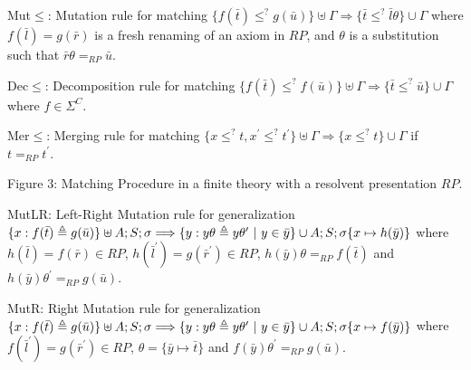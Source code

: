     
\par
 
Mut\ensuremath{\leq}: Mutation rule for matching  $\{f(\bar{t})\leq^{?}g(\bar{u})\}\uplus\Gamma\Longrightarrow\{\bar{t}\leq^{?}\bar{l}\theta\}\cup\Gamma$ where $f(\bar{l})=g(\bar{r})$ is a fresh renaming of an axiom in $RP$, and $\theta$ is a substitution such that $\bar{r}\theta=_{RP}\bar{u}$.\par
     
\par
 
Dec\ensuremath{\leq}: Decomposition rule for matching  $\{f(\bar{t})\leq^{?}f(\bar{u})\}\uplus\Gamma\Longrightarrow\{\bar{t}\leq^{?}\bar{u}\}\cup\Gamma$ where $f\in{\Sigma}^{C}$.\par
      
\par
 
Mer\ensuremath{\leq}: Merging rule for matching  $\{x\leq^{?}t,x^{\prime}\leq^{?}t^{\prime}\}\uplus\Gamma\Longrightarrow\{x\leq^{?}t\}\cup\Gamma$ if $t=_{RP}t^{\prime}$.\par
    
Figure 3: Matching Procedure in a finite theory with a resolvent presentation $RP$.\par
 
 
    
\par
 
MutLR: Left-Right Mutation rule for generalization  $\{x:f(\bar{t})\triangleq g(\bar{u})\}\uplus A;S;\sigma\Longrightarrow\{y:y\theta\triangleq y\theta^{\prime}\leavevmode\nobreak\ |\leavevmode\nobreak\ y\in\bar{y}\}\cup A;S;\sigma\{x\mapsto h(\bar{y})\}$ where $h(\bar{l})=f(\bar{r})\in RP$, $h(\bar{l}^{\prime})=g(\bar{r}^{\prime})\in RP$, $h(\bar{y})\theta=_{RP}f(\bar{t})$ and $h(\bar{y})\theta^{\prime}=_{RP}g(\bar{u})$.\par
      
\par
 
MutR: Right Mutation rule for generalization  $\{x:f(\bar{t})\triangleq g(\bar{u})\}\uplus A;S;\sigma\Longrightarrow\{y:y\theta\triangleq y\theta^{\prime}\leavevmode\nobreak\ |\leavevmode\nobreak\ y\in\bar{y}\}\cup A;S;\sigma\{x\mapsto f(\bar{y})\}$ where $f(\bar{l}^{\prime})=g(\bar{r}^{\prime})\in RP$, $\theta=\{\bar{y}\mapsto\bar{t}\}$ and $f(\bar{y})\theta^{\prime}=_{RP}g(\bar{u})$.\par
      
